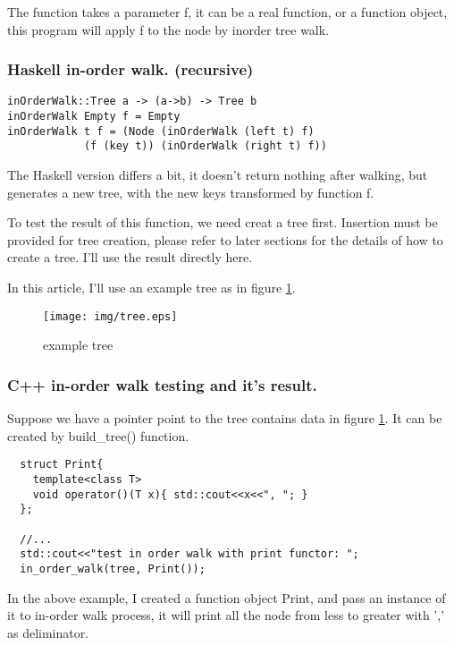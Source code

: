 \documentclass{article}
\begin{document}
The function takes a parameter f, it can be a real function, or a function
object, this program will apply f to the node by inorder tree walk.

\subsubsection*{Haskell in-order walk. (recursive)}
\lstset{language=Haskell}
\begin{lstlisting}
inOrderWalk::Tree a -> (a->b) -> Tree b
inOrderWalk Empty f = Empty
inOrderWalk t f = (Node (inOrderWalk (left t) f) 
            (f (key t)) (inOrderWalk (right t) f))
\end{lstlisting}

The Haskell version differs a bit, it doesn't return nothing after walking, 
but generates a new tree, with the new keys transformed by function f.

To test the result of this function, we need creat a tree first. Insertion
must be provided for tree creation, please refer to later sections for the
details of how to create a tree. I'll use the result directly here.

In this article, I'll use an example tree as in figure \ref{fig:example-tree}.

\begin{figure}[htbp]
       \begin{center}
	\texttt{[image: img/tree.eps]}
        \caption{example tree} \label{fig:example-tree}
       \end{center}
\end{figure}

\subsubsection*{C++ in-order walk testing and it's result.}

Suppose we have a pointer point to the tree contains data in figure 
\ref{fig:example-tree}. It can be created by build\_tree() function.

\lstset{language=C++}
\begin{lstlisting}
  struct Print{
    template<class T>
    void operator()(T x){ std::cout<<x<<", "; }
  };

  //...
  std::cout<<"test in order walk with print functor: ";
  in_order_walk(tree, Print());
\end{lstlisting}

In the above example, I created a function object Print, and pass an
instance of it to in-order walk process, it will print all the node
from less to greater with ',' as deliminator.
\end{document}
